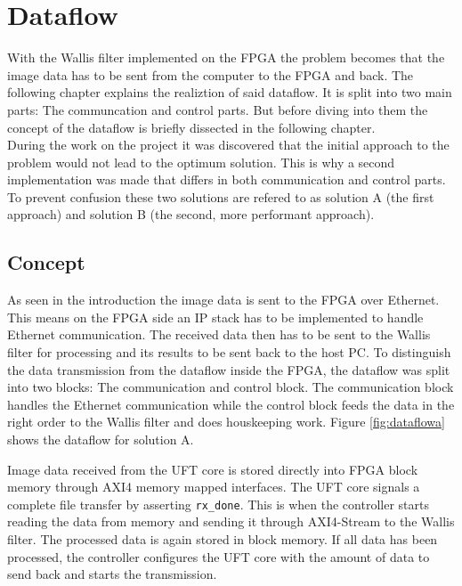 %
%
\chapter{Dataflow} \label{chapt:dataflow}
With the Wallis filter implemented on the FPGA the problem becomes that the
image data has to be sent from the computer to the FPGA and back. The following
chapter explains the realiztion of said dataflow. It is split into two main
parts: The communcation and control parts. But before diving into them the
concept of the dataflow is briefly dissected in the following chapter.\\

During the work on the project it was discovered that the initial approach to
the problem would not lead to the optimum solution. This is why a second
implementation was made that differs in both communication and control parts. To
prevent confusion these two solutions are refered to as solution A (the first
approach) and solution B (the second, more performant approach).

\section{Concept}
As seen in the introduction the image data is sent to the FPGA over Ethernet.
This means on the FPGA side an IP stack has to be implemented to handle Ethernet
communication. The received data then has to be sent to the Wallis filter for
processing and its results to be sent back to the host PC. To distinguish the
data transmission from the dataflow inside the FPGA, the dataflow was split into
two blocks: The communication and control block. The communication block handles
the Ethernet communication while the control block feeds the data in the right
order to the Wallis filter and does houskeeping work. Figure \ref{fig:dataflowa}
shows the dataflow for solution A.

Image data received from the UFT core is stored directly into FPGA block memory
through AXI4 memory mapped interfaces. The UFT core signals a complete file
transfer by asserting \texttt{rx\_done}. This is when the controller starts
reading the data from memory and sending it through AXI4-Stream to the Wallis
filter. The processed data is again stored in block memory. If all data has been
processed, the controller configures the UFT core with the amount of data to
send back and starts the transmission.

